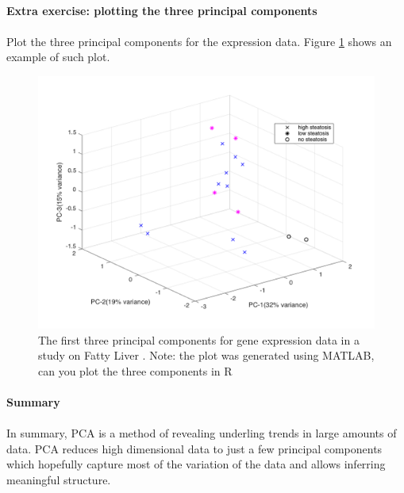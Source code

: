 \documentclass[11pt, oneside]{article}   	%
\begin{document}
\paragraph{Extra exercise: plotting the three principal components}
\paragraph{}

Plot the three principal components for the expression data.
Figure \ref{fig:example2-PCA-3D} shows an example of such plot.

\begin{figure}[!ht]
	\includegraphics[width=\textwidth]{example2-PCA-3D}
	\caption{The first three principal components for gene expression data in a study on Fatty Liver \cite{Wruck2015}. Note: the plot was generated using MATLAB, can you plot the three components in R}
	\label{fig:example2-PCA-3D}
\end{figure}


\paragraph{Summary}
\paragraph{}

In summary, PCA is a method of revealing underling trends in large amounts of data. PCA reduces high dimensional data to just a few principal components which hopefully capture most of the variation of the data and allows inferring meaningful structure.
\end{document}
